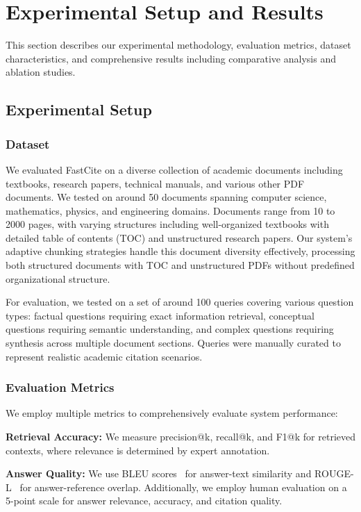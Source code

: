 \documentclass[runningheads]{llncs}
\begin{document}
%
%
\section{Experimental Setup and Results}

This section describes our experimental methodology, evaluation metrics, dataset characteristics, and comprehensive results including comparative analysis and ablation studies.

\subsection{Experimental Setup}

\subsubsection{Dataset}

We evaluated FastCite on a diverse collection of academic documents including textbooks, research papers, technical manuals, and various other PDF documents. We tested on around 50 documents spanning computer science, mathematics, physics, and engineering domains. Documents range from 10 to 2000 pages, with varying structures including well-organized textbooks with detailed table of contents (TOC) and unstructured research papers. Our system's adaptive chunking strategies handle this document diversity effectively, processing both structured documents with TOC and unstructured PDFs without predefined organizational structure.

For evaluation, we tested on a set of around 100 queries covering various question types: factual questions requiring exact information retrieval, conceptual questions requiring semantic understanding, and complex questions requiring synthesis across multiple document sections. Queries were manually curated to represent realistic academic citation scenarios.

\subsubsection{Evaluation Metrics}

We employ multiple metrics to comprehensively evaluate system performance:

\textbf{Retrieval Accuracy:} We measure precision@k, recall@k, and F1@k for retrieved contexts, where relevance is determined by expert annotation.

\textbf{Answer Quality:} We use BLEU scores~\cite{papineni2002bleu} for answer-text similarity and ROUGE-L~\cite{lin2004rouge} for answer-reference overlap. Additionally, we employ human evaluation on a 5-point scale for answer relevance, accuracy, and citation quality.
\end{document}
